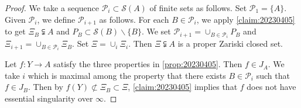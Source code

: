 \documentclass[10pt,a4paper]{amsart}
\begin{document}
\begin{proof}
		
		
		
		We take a sequence $\mathcal{P}_i\subset \mathcal{S}(A)$ of finite sets as follows.
		Set $\mathcal{P}_1=\{A\}$.
		Given $\mathcal{P}_i$, we define $\mathcal{P}_{i+1}$ as follows.
		For each $B\in\mathcal{P}_i$, we apply \cref{claim:20230405} to get $\Xi_B\subsetneqq A$ and $P_B\subset \mathcal{S}(B)\backslash\{B\}$.
		We set $\mathcal{P}_{i+1}=\cup_{B\in \mathcal{P}_i}P_B$ and $\Xi_{i+1}=\cup_{B\in\mathcal{P}_i}\Xi_B$.
		Set $\Xi=\cup_i\Xi_i$.
		Then $\Xi\subsetneqq A$ is a proper Zariski closed set.
		
		Let $f:Y\to A$ satisfy the three properties in \cref{prop:20230405}.
		Then $f\in J_A$.
		We take $i$ which is maximal among the property that there exists $B\in \mathcal{P}_i$ such that $f\in J_B$. 	
		Then by $f(Y)\not\subset \Xi_B\subset \Xi$,
		\cref{claim:20230405} implies that $f$ does not have essential singularity over $\infty$.
	\end{proof}
\end{document}

